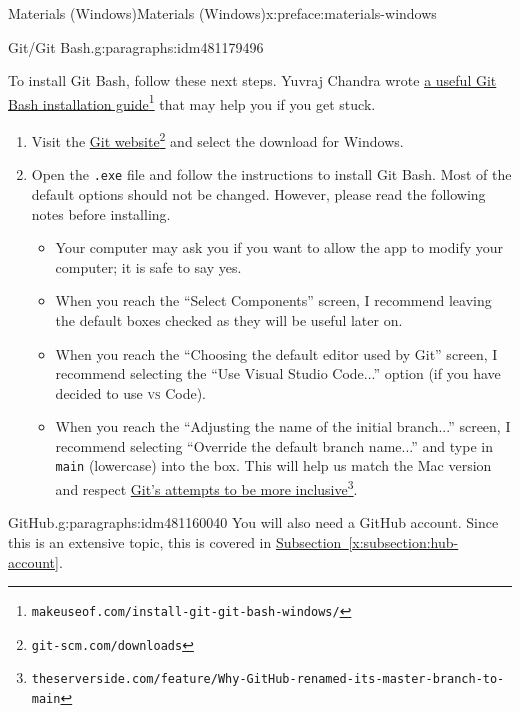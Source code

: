 \documentclass[oneside,10pt,]{book}
\newcommand{\xreffont}{\relax}
\newcommand{\mono}[1]{\texttt{#1}}
\newcommand{\initialism}[1]{\textsc{\MakeLowercase{#1}}}
\begin{document}
\begin{preface}{Materials (Windows)}{}{Materials (Windows)}{}{}{x:preface:materials-windows}
\begin{paragraphs}{Git\slash{}Git Bash.}{g:paragraphs:idm481179496}
\par
To install Git Bash, follow these next steps. Yuvraj Chandra wrote \href{https://www.makeuseof.com/install-git-git-bash-windows/}{a useful Git Bash installation guide}\footnote{\nolinkurl{makeuseof.com/install-git-git-bash-windows/}\label{g:fn:idm481180008}} that may help you if you get stuck.%
\begin{enumerate}
\item{}Visit the \href{https://git-scm.com/downloads}{Git website}\footnote{\nolinkurl{git-scm.com/downloads}\label{g:fn:idm481176040}} and select the download for Windows.%
\item{}Open the \mono{.exe} file and follow the instructions to install Git Bash. Most of the default options should not be changed. However, please read the following notes before installing.%
\begin{itemize}[label=\textbullet]
\item{}Your computer may ask you if you want to allow the app to modify your computer; it is safe to say yes.%
\item{}When you reach the ``Select Components'' screen, I recommend leaving the default boxes checked as they will be useful later on.%
\item{}When you reach the ``Choosing the default editor used by Git'' screen, I recommend selecting the ``Use Visual Studio Code...'' option (if you have decided to use \initialism{VS} Code).%
\item{}When you reach the ``Adjusting the name of the initial branch...'' screen, I recommend selecting ``Override the default branch name...'' and type in \mono{main} (lowercase) into the box. This will help us match the Mac version and respect \href{}{Git's attempts to be more inclusive}\footnote{\nolinkurl{theserverside.com/feature/Why-GitHub-renamed-its-master-branch-to-main}\label{g:fn:idm481173608}}.%
\end{itemize}
%
\end{enumerate}
%
\end{paragraphs}%
\begin{paragraphs}{GitHub.}{g:paragraphs:idm481160040}%
You will also need a GitHub account. Since this is an extensive topic, this is covered in \hyperref[x:subsection:hub-account]{Subsection~{\xreffont\ref{x:subsection:hub-account}}}.%
\end{paragraphs}%
\end{preface}
%
%
\typeout{************************************************}
\typeout{************************************************}
\end{document}
